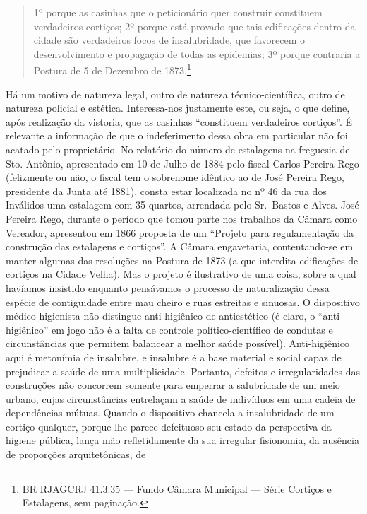 \begin{quote}
1º porque as casinhas que o peticionário quer construir constituem
verdadeiros cortiços; 2º porque está provado que tais edificações dentro
da cidade são verdadeiros focos de insalubridade, que favorecem o
desenvolvimento e propagação de todas as epidemias; 3º porque contraria
a Postura de 5 de Dezembro de 1873.\footnote{BR RJAGCRJ 41.3.35 --- Fundo
  Câmara Municipal --- Série Cortiços e Estalagens, sem paginação.}
\end{quote}

Há um motivo de natureza legal, outro de natureza técnico-científica,
outro de natureza policial e estética. Interessa-nos justamente este, ou
seja, o que define, após realização da vistoria, que as casinhas
``constituem verdadeiros cortiços''. É relevante a informação de que o
indeferimento dessa obra em particular não foi acatado pelo
proprietário. No relatório do número de estalagens na freguesia de Sto.
Antônio, apresentado em 10 de Julho de 1884 pelo fiscal Carlos Pereira
Rego (felizmente ou não, o fiscal tem o sobrenome idêntico ao de José
Pereira Rego, presidente da Junta até 1881), consta estar localizada no
nº 46 da rua dos Inválidos uma estalagem com 35 quartos, arrendada pelo
Sr.~Bastos e Alves. José Pereira Rego, durante o período que tomou parte
nos trabalhos da Câmara como Vereador, apresentou em 1866 proposta de um
``Projeto para regulamentação da construção das estalagens e cortiços''.
A Câmara engavetaria, contentando-se em manter algumas das resoluções na
Postura de 1873 (a que interdita edificações de cortiços na Cidade
Velha). Mas o projeto é ilustrativo de uma coisa, sobre a qual havíamos
insistido enquanto pensávamos o processo de naturalização dessa espécie
de contiguidade entre mau cheiro e ruas estreitas e sinuosas. O
dispositivo médico-higienista não distingue anti-higiênico de
antiestético (é claro, o ``anti-higiênico'' em jogo não é a falta de
controle político-científico de condutas e circunstâncias que permitem
balancear a melhor saúde possível). Anti-higiênico aqui é metonímia de
insalubre, e insalubre é a base material e social capaz de prejudicar a
saúde de uma multiplicidade. Portanto, defeitos e irregularidades das
construções não concorrem somente para emperrar a salubridade de um meio
urbano, cujas circunstâncias entrelaçam a saúde de indivíduos em uma
cadeia de dependências mútuas. Quando o dispositivo chancela a
insalubridade de um cortiço qualquer, porque lhe parece defeituoso seu
estado da perspectiva da higiene pública, lança mão refletidamente da
sua irregular fisionomia, da ausência de proporções arquitetônicas, de

